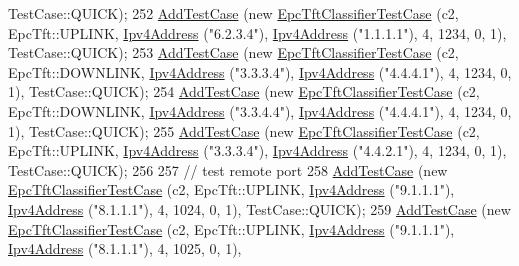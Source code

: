 \begin{DoxyCode}
      TestCase::QUICK);
252   \hyperlink{classns3_1_1TestCase_a3718088e3eefd5d6454569d2e0ddd835}{AddTestCase} (\textcolor{keyword}{new} \hyperlink{classEpcTftClassifierTestCase}{EpcTftClassifierTestCase} (c2, EpcTft::UPLINK,   
      \hyperlink{classns3_1_1Ipv4Address}{Ipv4Address} (\textcolor{stringliteral}{"6.2.3.4"}), \hyperlink{classns3_1_1Ipv4Address}{Ipv4Address} (\textcolor{stringliteral}{"1.1.1.1"}),     4,     1234,     0,    1), 
      TestCase::QUICK);
253   \hyperlink{classns3_1_1TestCase_a3718088e3eefd5d6454569d2e0ddd835}{AddTestCase} (\textcolor{keyword}{new} \hyperlink{classEpcTftClassifierTestCase}{EpcTftClassifierTestCase} (c2, EpcTft::DOWNLINK, 
      \hyperlink{classns3_1_1Ipv4Address}{Ipv4Address} (\textcolor{stringliteral}{"3.3.3.4"}), \hyperlink{classns3_1_1Ipv4Address}{Ipv4Address} (\textcolor{stringliteral}{"4.4.4.1"}),     4,     1234,     0,    1), 
      TestCase::QUICK);
254   \hyperlink{classns3_1_1TestCase_a3718088e3eefd5d6454569d2e0ddd835}{AddTestCase} (\textcolor{keyword}{new} \hyperlink{classEpcTftClassifierTestCase}{EpcTftClassifierTestCase} (c2, EpcTft::DOWNLINK, 
      \hyperlink{classns3_1_1Ipv4Address}{Ipv4Address} (\textcolor{stringliteral}{"3.3.4.4"}), \hyperlink{classns3_1_1Ipv4Address}{Ipv4Address} (\textcolor{stringliteral}{"4.4.4.1"}),     4,     1234,     0,    1), 
      TestCase::QUICK);
255   \hyperlink{classns3_1_1TestCase_a3718088e3eefd5d6454569d2e0ddd835}{AddTestCase} (\textcolor{keyword}{new} \hyperlink{classEpcTftClassifierTestCase}{EpcTftClassifierTestCase} (c2, EpcTft::UPLINK,   
      \hyperlink{classns3_1_1Ipv4Address}{Ipv4Address} (\textcolor{stringliteral}{"3.3.3.4"}), \hyperlink{classns3_1_1Ipv4Address}{Ipv4Address} (\textcolor{stringliteral}{"4.4.2.1"}),     4,     1234,     0,    1), 
      TestCase::QUICK);
256 
257   \textcolor{comment}{// test remote port}
258   \hyperlink{classns3_1_1TestCase_a3718088e3eefd5d6454569d2e0ddd835}{AddTestCase} (\textcolor{keyword}{new} \hyperlink{classEpcTftClassifierTestCase}{EpcTftClassifierTestCase} (c2, EpcTft::UPLINK,   
      \hyperlink{classns3_1_1Ipv4Address}{Ipv4Address} (\textcolor{stringliteral}{"9.1.1.1"}), \hyperlink{classns3_1_1Ipv4Address}{Ipv4Address} (\textcolor{stringliteral}{"8.1.1.1"}),     4,     1024,     0,    1), 
      TestCase::QUICK);
259   \hyperlink{classns3_1_1TestCase_a3718088e3eefd5d6454569d2e0ddd835}{AddTestCase} (\textcolor{keyword}{new} \hyperlink{classEpcTftClassifierTestCase}{EpcTftClassifierTestCase} (c2, EpcTft::UPLINK,   
      \hyperlink{classns3_1_1Ipv4Address}{Ipv4Address} (\textcolor{stringliteral}{"9.1.1.1"}), \hyperlink{classns3_1_1Ipv4Address}{Ipv4Address} (\textcolor{stringliteral}{"8.1.1.1"}),     4,     1025,     0,    1), 

\end{DoxyCode}
